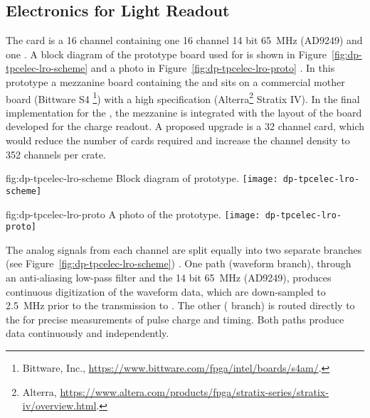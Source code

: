 \subsection{Electronics for Light Readout}
\label{sec:fddp-tpc-elec-design-lro}
%
The  card is a \num{16} channel  containing one \num{16} channel \num{14} bit \SI{65}{\MHz}  (AD9249) and one  . A block diagram of the prototype board used for  is shown in Figure~\ref{fig:dp-tpcelec-lro-scheme} and a photo in Figure~\ref{fig:dp-tpcelec-lro-proto} . In this prototype a mezzanine board containing the  and  sits on a commercial mother board (Bittware S4 \footnote{Bittware\texttrademark{}, Inc., \url{https://www.bittware.com/fpga/intel/boards/s4am/}.}) with a high specification  (Alterra\footnote{Alterra\texttrademark{}, \url{https://www.altera.com/products/fpga/stratix-series/stratix-iv/overview.html}.} Stratix IV). In the final implementation for the , the mezzanine is integrated with the layout of the  board developed for the charge readout.  
A proposed upgrade is a \num{32} channel card, %
which would reduce the number of cards required and increase the channel density to \num{352} channels per  crate.

\begin{dunefigure}{fig:dp-tpcelec-lro-scheme}
{Block diagram of  prototype.}
\texttt{[image: dp-tpcelec-lro-scheme]}
\end{dunefigure}

\begin{dunefigure}{fig:dp-tpcelec-lro-proto}
{A photo of the  prototype.}
\texttt{[image: dp-tpcelec-lro-proto]}
\end{dunefigure}

The analog signals from each  channel are split equally into two separate branches (see Figure~\ref{fig:dp-tpcelec-lro-scheme}) . One path (waveform branch), through an anti-aliasing low-pass filter and the \num{14} bit \SI{65}{\MHz}  (AD9249), produces continuous digitization of the  waveform data, which are down-sampled to \SI{2.5}{MHz} prior to the transmission to . The other ( branch) is routed directly to the   for precise measurements of pulse charge and timing. Both paths produce data continuously and independently.

